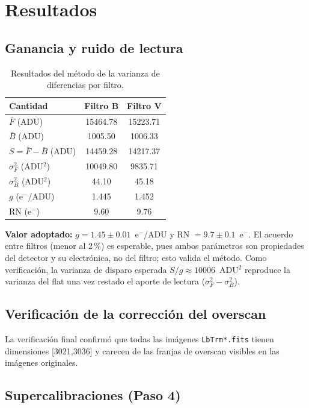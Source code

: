 \documentclass[10pt,a4paper,twocolumn]{article}
\begin{document}
\section{Resultados}
\subsection{Ganancia y ruido de lectura}
\begin{table}[ht]
\centering
\caption{Resultados del método de la varianza de diferencias por filtro.}
\label{tab:ganancia}
\begin{tabular}{lcc}
\toprule
Cantidad & Filtro B & Filtro V \\
\midrule
$\bar{F}$ (ADU)              & 15464.78 & 15223.71 \\
$\bar{B}$ (ADU)              & 1005.50  & 1006.33  \\
$S=\bar{F}-\bar{B}$ (ADU)    & 14459.28 & 14217.37 \\
$\sigma^2_F$ (ADU$^2$)       & 10049.80 & 9835.71  \\
$\sigma^2_B$ (ADU$^2$)       & 44.10    & 45.18    \\
\midrule
$g$ (e$^-$/ADU)              & 1.445    & 1.452    \\
RN (e$^-$)                   & 9.60     & 9.76     \\
\bottomrule
\end{tabular}
\end{table}

\noindent\textbf{Valor adoptado:} $g = 1.45 \pm 0.01$~e$^-$/ADU y
RN $= 9.7 \pm 0.1$~e$^-$. El acuerdo entre filtros (menor al 2\,\%) es
esperable, pues ambos parámetros son propiedades del detector y su
electrónica, no del filtro; esto valida el método. Como verificación, la
varianza de disparo esperada $S/g \approx 10006$~ADU$^2$ reproduce la
varianza del flat una vez restado el aporte de lectura ($\sigma^2_F -
\sigma^2_B$).

\subsection{Verificación de la corrección del overscan}
\noindent La verificación final confirmó que todas las imágenes
\texttt{LbTrm*.fits} tienen dimensiones [3021,3036] y carecen de las
franjas de overscan visibles en las imágenes originales.

\subsection{Supercalibraciones (Paso 4)}
\end{document}
